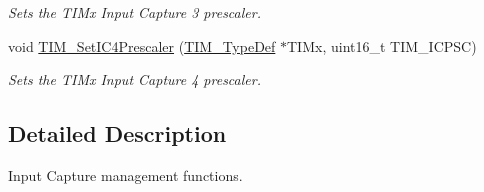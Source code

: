 \begin{DoxyCompactItemize}
\begin{DoxyCompactList}\small\item\em Sets the T\+I\+Mx Input Capture 3 prescaler. \end{DoxyCompactList}\item 
void \hyperlink{group___t_i_m___group3_ga0f2c784271356d6b64b8c0da64dbdbc2}{T\+I\+M\+\_\+\+Set\+I\+C4\+Prescaler} (\hyperlink{struct_t_i_m___type_def}{T\+I\+M\+\_\+\+Type\+Def} $\ast$T\+I\+Mx, uint16\+\_\+t T\+I\+M\+\_\+\+I\+C\+P\+SC)
\begin{DoxyCompactList}\small\item\em Sets the T\+I\+Mx Input Capture 4 prescaler. \end{DoxyCompactList}\end{DoxyCompactItemize}


\subsection{Detailed Description}
Input Capture management functions. 

